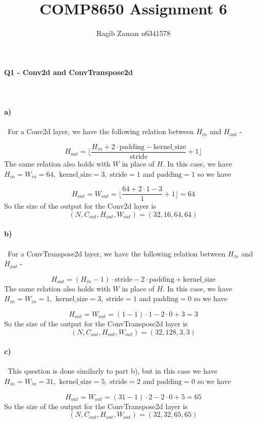 \documentclass[a4paper,12pt]{article}
\title{COMP8650 Assignment 6}
\author{Ragib Zaman u6341578}
\begin{document}
\maketitle


\paragraph{Q1 - Conv2d and ConvTranspose2d}
\
\newline

\paragraph{a)}
\
For a Conv2d layer, we have the following relation between $H_{in}$ and $H_{out}$ -

$$ H_{out} =\bigg\lfloor \frac{ H_{in} + 2 \cdot \text{padding} - \text{kernel\_size} }{ \text{stride} } + 1\bigg\rfloor$$
The same relation also holds with $W$ in place of $H.$ In this case, we have $H_{in} = W_{in} = 64,$ $\text{kernel\_size} = 3, \ \text{stride} = 1$ and $\text{padding}=1$ so we have

$$ H_{out} = W_{out} = \bigg\lfloor \frac{ 64 + 2 \cdot 1 - 3 }{ 1 } + 1\bigg\rfloor = 64$$
So the size of the output for the Conv2d layer is
$$(N, C_{out}, H_{out}, W_{out} ) = (32, 16, 64, 64)$$
\paragraph{b)}
\
For a ConvTranspose2d layer, we have the following relation between $H_{in}$ and $H_{out}$ -

$$ H_{out} = (H_{in}-1)\cdot \text{stride} - 2\cdot \text{padding} + \text{kernel\_size}$$
The same relation also holds with $W$ in place of $H.$ In this case, we have $H_{in} = W_{in} = 1,$ $\text{kernel\_size} = 3, \ \text{stride} = 1$ and $\text{padding}=0$ so we have

$$ H_{out} = W_{out} = (1-1)\cdot 1 - 2\cdot 0 + 3 = 3$$
So the size of the output for the ConvTranspose2d layer is
$$(N, C_{out}, H_{out}, W_{out} ) = (32, 128, 3, 3)$$
\paragraph{c)}
\
This question is done similarly to part b), but in this case we have $H_{in} = W_{in} = 31,$ $\text{kernel\_size} = 5, \ \text{stride} = 2$ and $\text{padding}=0$ so we have

$$ H_{out} = W_{out} = (31-1)\cdot 2 - 2\cdot 0 + 5 = 65$$
So the size of the output for the ConvTranspose2d layer is
$$(N, C_{out}, H_{out}, W_{out} ) = (32, 32, 65, 65)$$
\end{document}
